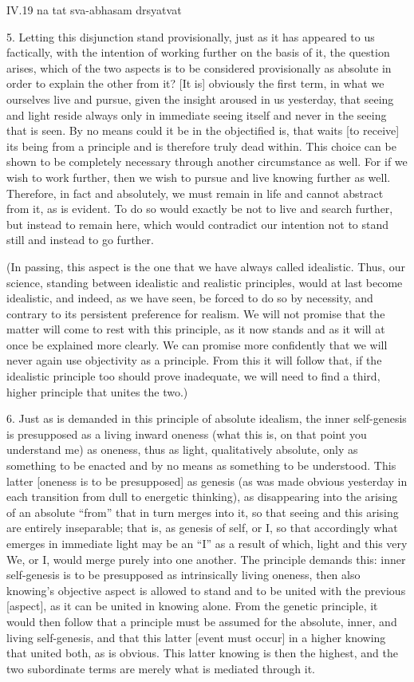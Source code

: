 IV.19
na tat sva-abhasam drsyatvat

5. Letting this disjunction stand provisionally,
just as it has appeared to us factically,
with the intention of working further
on the basis of it, the question arises,
which of the two aspects is to be
considered provisionally as absolute
in order to explain the other from it?
[It is] obviously the first term,
in what we ourselves live and pursue,
given the insight aroused in us yesterday,
that seeing and light reside always
only in immediate seeing itself and
never in the seeing that is seen.
By no means could it be in the objectified is,
that waits [to receive] its being from a principle
and is therefore truly dead within.
This choice can be shown to be completely necessary
through another circumstance as well.
For if we wish to work further,
then we wish to pursue and live knowing further as well.
Therefore, in fact and absolutely, we must remain in life
and cannot abstract from it, as is evident.
To do so would exactly be not to live and search further,
but instead to remain here,
which would contradict our intention
not to stand still and instead to go further.

(In passing, this aspect is the one
that we have always called idealistic.
Thus, our science, standing between
idealistic and realistic principles,
would at last become idealistic,
and indeed, as we have seen,
be forced to do so by necessity,
and contrary to its persistent
preference for realism.
We will not promise that the matter
will come to rest with this principle,
as it now stands and as it will
at once be explained more clearly.
We can promise more confidently that
we will never again use objectivity as a principle.
From this it will follow that,
if the idealistic principle too
should prove inadequate,
we will need to find a third, higher principle
that unites the two.)

6. Just as is demanded in this principle of absolute idealism,
the inner self-genesis is presupposed
as a living inward oneness
(what this is, on that point you understand me)
as oneness, thus as light, qualitatively absolute,
only as something to be enacted
and by no means as something to be understood.
This latter [oneness is to be presupposed] as genesis
(as was made obvious yesterday in each transition
from dull to energetic thinking),
as disappearing into the arising
of an absolute “from”
that in turn merges into it,
so that seeing and this arising are entirely inseparable;
that is, as genesis of self, or I,
so that accordingly what emerges in immediate light
may be an “I” as a result of which,
light and this very We, or I,
would merge purely into one another.
The principle demands this:
inner self-genesis is to be presupposed
as intrinsically living oneness,
then also knowing's objective aspect is
allowed to stand and to be united
with the previous [aspect],
as it can be united in knowing alone.
From the genetic principle,
it would then follow that a principle must be assumed for
the absolute, inner, and living self-genesis,
and that this latter [event must occur]
in a higher knowing that united both, as is obvious.
This latter knowing is then the highest,
and the two subordinate terms are
merely what is mediated through it.


